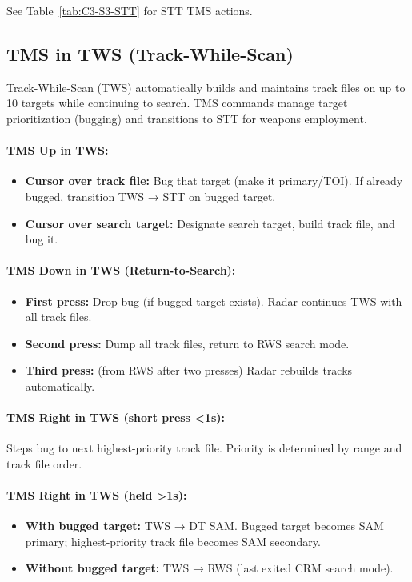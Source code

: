 \documentclass[11pt, a4paper, twoside]{report}
\begin{document}
See Table~\ref{tab:C3-S3-STT} for STT TMS actions.

\subsection{TMS in TWS (Track-While-Scan)}
\label{sec:C3-S3-S3}

Track-While-Scan (TWS) automatically builds and maintains track files on up to 10 targets while continuing to search. TMS commands manage target prioritization (bugging) and transitions to STT for weapons employment.

\paragraph{TMS Up in TWS:}
\begin{itemize}
    \item \textbf{Cursor over track file:} Bug that target (make it primary/TOI). If already bugged, transition TWS → STT on bugged target.
    \item \textbf{Cursor over search target:} Designate search target, build track file, and bug it.
\end{itemize}

\paragraph{TMS Down in TWS (Return-to-Search):}
\begin{itemize}
    \item \textbf{First press:} Drop bug (if bugged target exists). Radar continues TWS with all track files.
    \item \textbf{Second press:} Dump all track files, return to RWS search mode.
    \item \textbf{Third press:} (from RWS after two presses) Radar rebuilds tracks automatically.
\end{itemize}

\paragraph{TMS Right in TWS (short press <1s):}
Steps bug to next highest-priority track file. Priority is determined by range and track file order.

\paragraph{TMS Right in TWS (held >1s):}
\begin{itemize}
    \item \textbf{With bugged target:} TWS → DT SAM. Bugged target becomes SAM primary; highest-priority track file becomes SAM secondary.
    \item \textbf{Without bugged target:} TWS → RWS (last exited CRM search mode).
\end{itemize}
\end{document}
